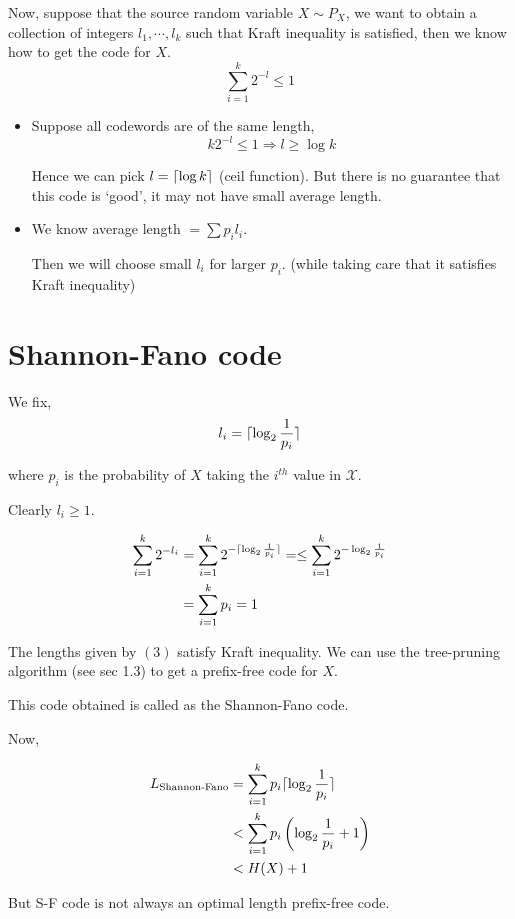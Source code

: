 \documentclass{article}
\DeclarePairedDelimiter{\ceil}{\lceil}{\rceil}
\begin{document}
Now, suppose that the source random variable $X \sim P_X$, we want to obtain a collection of integers $l_1, \cdots, l_k$ such that Kraft inequality is satisfied, then we know how to get the code for $X$.
$$ \sum_{i=1}^{k} 2^{-l} \leq 1$$
\begin{itemize}
    \item Suppose all codewords are of the same length, $$ k 2^{-l} \leq 1 \Rightarrow l \geq \log k$$

    Hence we can pick $l = \ceil{\log k}$ (ceil function). But there is no guarantee that this code is `good', it may not have small average length.

    \item We know average length $= \sum p_i l_i$.

    Then we will choose small $l_i$ for larger $p_i$. (while taking care that it satisfies Kraft inequality)
\end{itemize}

\section{Shannon-Fano code}

We fix,
\begin{equation}
    l_i = \ceil{ \log_2 \frac{1}{p_i}}
\end{equation}

 where $p_i$ is the probability of $X$ taking the $i^{th}$ value in $\mathcal{X}$.

Clearly $l_i \geq 1$.

\begin{align*}
    \sum_{i=1}^k 2^{-l_i} &= \sum_{i=1}^k 2^{-\ceil{\log_2 \frac{1}{p_i}}}  =\leq \sum_{i=1}^{k} 2^{- \log_2 \frac{1}{p_i}} \\
    &= \sum_{i=1}^k p_i = 1
\end{align*}

The lengths given by $(3)$ satisfy Kraft inequality. We can use the tree-pruning algorithm (see sec 1.3) to get a prefix-free code for $X$.

This code obtained is called as the Shannon-Fano code.

Now,

\begin{align*}
    L_{\text{Shannon-Fano}} &= \sum_{i=1}^{k} p_i \ceil{\log_2 \frac{1}{p_i}} \\
    &< \sum_{i=1}^{k} p_i \left( \log_2 \frac{1}{p_i} +1 \right) \\
    &< H(X)+1
\end{align*}

But S-F code is not always an optimal length prefix-free code. 
\end{document}
